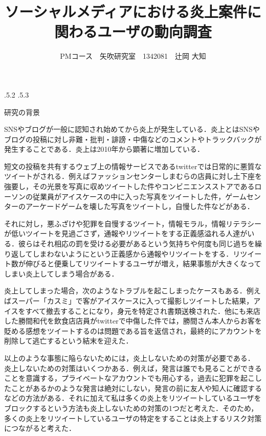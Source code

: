 \documentclass[uplatex]{jsarticle}
\title{\vspace{-14mm}ソーシャルメディアにおける炎上案件に関わるユーザの動向調査}
\author{PMコース　矢吹研究室　1342081　辻岡 大知}
\date{}%
\makeatletter
\renewcommand{\section}{%
    \if@slide\clearpage\fi
    \@startsection{section}{1}{\z@}%
    {\Cvs \@plus.5\Cdp \@minus.2\Cdp}%
    {.5\Cvs \@plus.3\Cdp}%
    {\normalfont\raggedright}}
\makeatother
\begin{document}
\maketitle





\section{研究の背景}

 SNSやブログが一般に認知され始めてから炎上が発生している．炎上とはSNSやブログの投稿に対し非難・批判・誹謗・中傷などのコメントやトラックバックが発生することである．炎上は2010年から顕著に増加している\cite{a}．

 短文の投稿を共有するウェブ上の情報サービスであるtwitterでは日常的に悪質なツイートがされる\cite{b}．例えばファッションセンターしまむらの店員に対し土下座を強要し，その光景を写真に収めツイートした件やコンビニエンスストアであるローソンの従業員がアイスケースの中に入った写真をツイートした件，ゲームセンターのアーケードゲームを壊した写真をツイートし，自慢した件などがある．

 それに対し，悪ふざけや犯罪を自慢するツイート，情報モラル，情報リテラシーが低いツイートを見過ごさず，通報やリツイートをする正義感溢れる人達がいる．彼らはそれ相応の罰を受ける必要があるという気持ちや何度も同じ過ちを繰り返してしまわないようにという正義感から通報やリツイートをする．リツイート数が伸びると便乗してリツイートするユーザが増え，結果事態が大きくなってしまい炎上してしまう場合がある．
 
 炎上してしまった場合，次のようなトラブルを起こしまったケースもある．例えばスーパー「カスミ」で客がアイスケースに入って撮影しツイートした結果，アイスをすべて撤去することになり，身元を特定され書類送検された．他にも来店した勝間和代を飲食店店員がtwitterで中傷した件では，勝間さん本人からお客を貶める感想をツイートするのは問題である旨を返信され，最終的にアカウントを削除して逃亡するという結末を迎えた\cite{t}．

 以上のような事態に陥らないためには，炎上しないための対策が必要である． 炎上しないための対策はいくつかある．例えば，発言は誰でも見ることができることを意識する，プライベートなアカウントでも用心する，過去に犯罪を起こしたことがあるかのような発言は絶対にしない，発言の前に友人や知人に確認するなどの方法がある\cite{enjo}．それに加えて私は多くの炎上をリツイートしているユーザをブロックするという方法も炎上しないための対策の1つだと考えた．そのため，多くの炎上をリツイートしているユーザの特定をすることは炎上するリスク対策につながると考えた．
\end{document}
